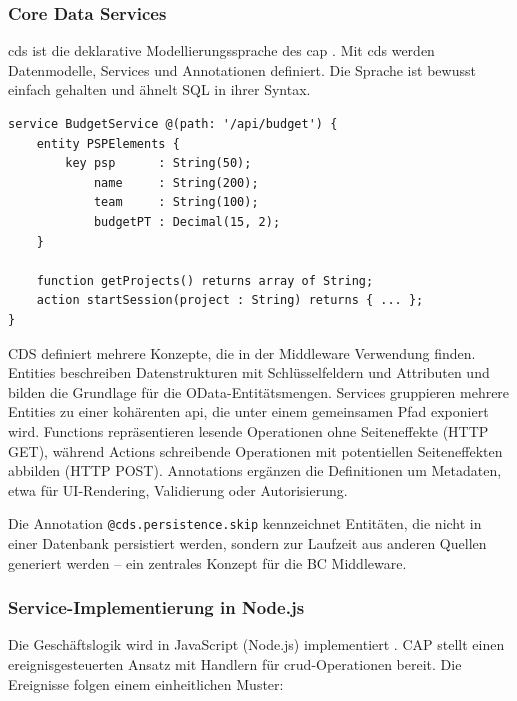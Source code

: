 \subsubsection{Core Data Services}

\gls{cds} ist die deklarative Modellierungssprache des \gls{cap} \citep{sap2024cds}. Mit \gls{cds} werden Datenmodelle, Services und Annotationen definiert. Die Sprache ist bewusst einfach gehalten und ähnelt SQL in ihrer Syntax.

\begin{lstlisting}[caption={Beispiel einer CDS-Service-Definition}, label={lst:cds-example}]
service BudgetService @(path: '/api/budget') {
    entity PSPElements {
        key psp      : String(50);
            name     : String(200);
            team     : String(100);
            budgetPT : Decimal(15, 2);
    }

    function getProjects() returns array of String;
    action startSession(project : String) returns { ... };
}
\end{lstlisting}

CDS definiert mehrere Konzepte, die in der Middleware Verwendung finden. Entities beschreiben Datenstrukturen mit Schlüsselfeldern und Attributen und bilden die Grundlage für die OData-Entitätsmengen. Services gruppieren mehrere Entities zu einer kohärenten \gls{api}, die unter einem gemeinsamen Pfad exponiert wird. Functions repräsentieren lesende Operationen ohne Seiteneffekte (HTTP GET), während Actions schreibende Operationen mit potentiellen Seiteneffekten abbilden (HTTP POST). Annotations ergänzen die Definitionen um Metadaten, etwa für UI-Rendering, Validierung oder Autorisierung.

Die Annotation \texttt{@cds.persistence.skip} kennzeichnet Entitäten, die nicht in einer Datenbank persistiert werden, sondern zur Laufzeit aus anderen Quellen generiert werden -- ein zentrales Konzept für die BC Middleware.

\subsubsection{Service-Implementierung in Node.js}

Die Geschäftslogik wird in JavaScript (Node.js) implementiert \citep{nodejs2024}. CAP stellt einen ereignisgesteuerten Ansatz mit Handlern für \gls{crud}-Operationen bereit. Die Ereignisse folgen einem einheitlichen Muster:

